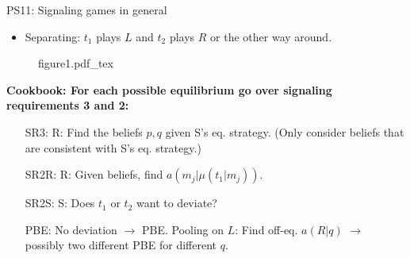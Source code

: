 \begin{frame}{PS11: Signaling games in general}
\begin{multicols}{2}
\begin{itemize}
        \item \vspace{-4pt} Separating: $t_1$ plays $L$ and $t_2$ plays $R$ or the other way around.
      \end{itemize}
      \vfill\null\columnbreak
      \begin{figure}[!h]
        \center
        \def\svgwidth{\columnwidth}
        {figure1.pdf_tex}
      \end{figure} \vspace{-6pt}
      \textbf{Cookbook: For each possible equilibrium go over signaling requirements 3 and 2:}\vspace{-6pt}
      \begin{itemize}
        \item[SR3:] R: Find the beliefs $p,q$ given S's eq. strategy. (Only consider beliefs that are consistent with S's eq. strategy.)
        \item[SR2R:] \vspace{-2pt} R: Given beliefs, find $a(m_j|\mu(t_1|m_j))$.
        \item[SR2S:] \vspace{-2pt} S: Does $t_1$ or $t_2$ want to deviate?
        \item[PBE:]  \vspace{-2pt} No deviation $\rightarrow$ PBE. Pooling on $L$: Find off-eq. $a(R|q)$ $\rightarrow$ possibly two different PBE for different $q$.
      \end{itemize}
      \vfill\null
    \end{multicols}
\end{frame}


